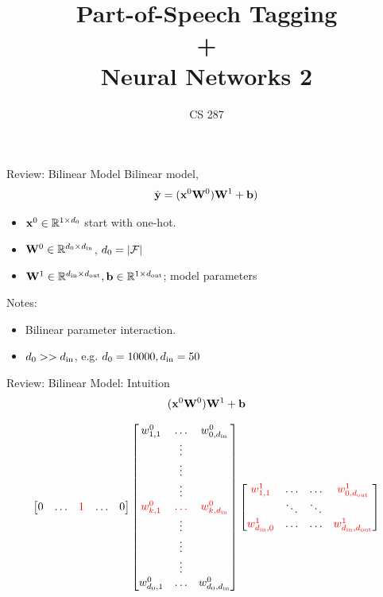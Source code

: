\documentclass{beamer}
\title{Part-of-Speech Tagging \\ + \\ Neural Networks 2}
\date{}
\author{CS 287}
\begin{document}
\maketitle{}

\begin{frame}{Review:  Bilinear Model}
  Bilinear model,
  \[\hat{\mathbf{y}} = (\mathbf{x}^0 \mathbf{W}^0)\mathbf{W}^1 + \mathbf{b})\]
  \begin{itemize}
  \item $\mathbf{x}^0 \in \mathbb{R}^{1 \times d_0}$ start with one-hot.
  \item $\mathbf{W}^0 \in \mathbb{R}^{d_0 \times {d_{\mathrm{in}}}}$, $d_0 = |\mathcal{F}|$
  \item $\mathbf{W}^1 \in \mathbb{R}^{{d_{\mathrm{in}}} \times {d_{\mathrm{out}}}}, \mathbf{b} \in \mathbb{R}^{1 \times {d_{\mathrm{out}}}}$; model parameters
  \end{itemize}
  \air
  Notes:
  \begin{itemize}
  \item Bilinear parameter interaction.
  \item $d_0 >> {d_{\mathrm{in}}}$, e.g. $d_0 = 10000, {d_{\mathrm{in}}} = 50$
  \end{itemize}

\end{frame}

\begin{frame}{Review:  Bilinear Model: Intuition}
  \[ (\mathbf{x}^0 \mathbf{W}^0)\mathbf{W}^1 + \mathbf{b}\]


  \[
    \begin{bmatrix}
      0 & \ldots & \textcolor{red}{1} & \ldots & 0 \\
    \end{bmatrix}
    \begin{bmatrix}
      w^0_{1,1} &  \ldots &w^0_{0, {d_{\mathrm{in}}}}\\
      & \vdots & \\
      & \vdots & \\
      & \vdots & \\
      \textcolor{red}{w^0_{k,1}} &  \textcolor{red}{\ldots} &\textcolor{red}{w^0_{k,{d_{\mathrm{in}}}}}\\
      & \vdots & \\
      & \vdots & \\
      & \vdots & \\
      w^0_{d_0, 1} &  \ldots &w^0_{d_0, {d_{\mathrm{in}}}}\\
    \end{bmatrix}
    \begin{bmatrix}
      \textcolor{red}{w^1_{1,1}} &  \ldots & \ldots &   \textcolor{red}{w^1_{0, {d_{\mathrm{out}}}}}\\
      & \ddots & \ddots &  \\
      \textcolor{red}{w^1_{{d_{\mathrm{in}}},0}} &  \ldots & \ldots & \textcolor{red}{w^1_{{d_{\mathrm{in}}}, {d_{\mathrm{out}}}}}\\
    \end{bmatrix}
  \]

\end{frame}
\end{document}
